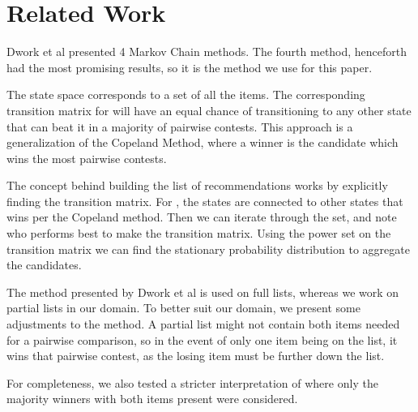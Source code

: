 \section{Related Work}
Dwork et al presented 4 Markov Chain methods. The fourth method, henceforth \MC had the most promising results, so it is the method we use for this paper.

The state space corresponds to a set of all the items. The corresponding transition matrix for \MC will have an equal chance of transitioning to any other state that can beat it in a majority of pairwise contests. This approach is a generalization of the Copeland Method, where a winner is the candidate which wins the most pairwise contests.

The concept behind building the list of recommendations works by explicitly finding the transition matrix. For \MC, the states are connected to other states that wins per the Copeland method. Then we can iterate through the set, and note who performs best to make the transition matrix. Using the power set on the transition matrix we can find the stationary probability distribution to aggregate the candidates.

The method presented by Dwork et al is used on full lists, whereas we work on partial lists in our domain. To better suit our domain, we present some adjustments to the method. A partial list might not contain both items needed for a pairwise comparison, so in the event of only one item being on the list, it wins that pairwise contest, as the losing item must be further down the list.

For completeness, we also tested a stricter interpretation of \MC where only the majority winners with both items present were considered.
\cite{rank:aggregation}